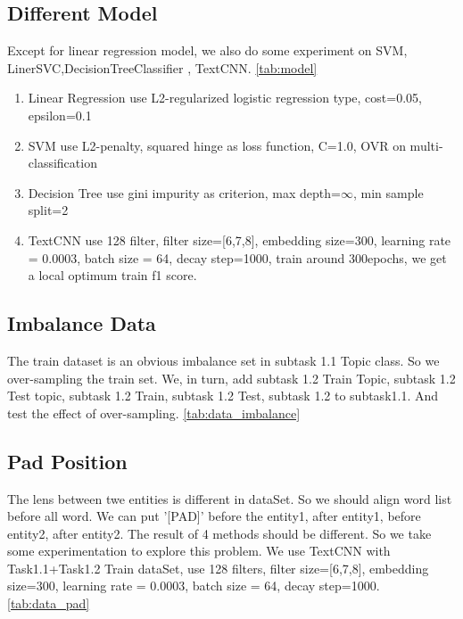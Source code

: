 

\subsection{Different Model}
\label{sec:different_model}

Except for linear regression model, we also do some experiment on SVM, LinerSVC,DecisionTreeClassifier , TextCNN. \ref{tab:model}

\begin{enumerate}
    \item Linear Regression use L2-regularized logistic regression type, cost=0.05, epsilon=0.1
    \item SVM use L2-penalty, squared hinge as loss function, C=1.0, OVR on multi-classification
    \item Decision Tree use gini impurity as criterion, max depth=$\infty$, min sample split=2
    \item TextCNN use 128 filter, filter size=[6,7,8], embedding size=300, learning rate = 0.0003, batch size = 64, decay step=1000, train around 300epochs, we get a local optimum train f1 score.
\end{enumerate}



\subsection{Imbalance Data}
\label{sec:impalance_data}

The train dataset is an obvious imbalance set in subtask 1.1 Topic class. So we over-sampling the train set. We, in turn, add subtask 1.2 Train Topic, subtask 1.2 Test topic, subtask 1.2 Train, subtask 1.2 Test, subtask 1.2 to subtask1.1. And test the effect of over-sampling. \ref{tab:data_imbalance}



\subsection{Pad Position}
\label{sec:pad_position}

The lens between twe entities is different in dataSet. So we should align word list before all word. We can put '[PAD]' before the entity1, after entity1, before entity2, after entity2. The result of 4 methods should be different. So we take some experimentation to explore this problem. We use TextCNN with Task1.1+Task1.2 Train dataSet, use 128 filters, filter size=[6,7,8], embedding size=300, learning rate = 0.0003, batch size = 64, decay step=1000. \ref{tab:data_pad}

